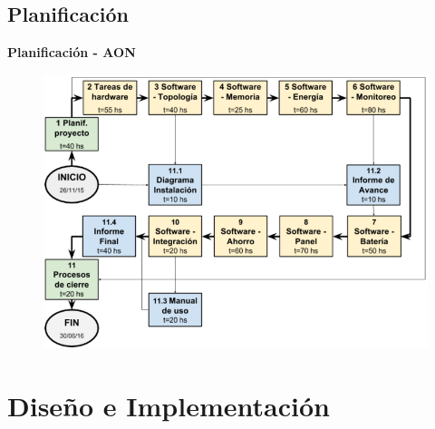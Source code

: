 \documentclass[aspectratio=43, handout]{beamer}
\begin{document}
\subsection[Plan]{Planificación}
\begin{frame}[t]{\textbf{\LARGE{Planificación - AON}}}
		\begin{figure}[H]
			{\includegraphics[width=1\textwidth]{./imagenes/Aon.PNG}}
		\end{figure}	 
\end{frame}

\section{Diseño e Implementación}
\end{document}
